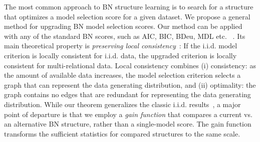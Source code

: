 \documentclass{article}
\begin{document}
The most common approach to BN structure learning is to search for a structure that optimizes a model selection score for a given dataset. We propose a general method for upgrading BN model selection scores.
Our method can be applied with any of the standard BN scores, such as AIC, BIC, BDeu, MDL etc. ~\cite{bouckaert95:_bayes}. Its main theoretical property is {\em preserving local consistency}~\cite{Chickering2002}: If the i.i.d. model criterion is locally consistent for i.i.d. data, the upgraded criterion is locally consistent for multi-relational data. Local consistency combines (i) consistency: as the amount of available data increases, the model selection criterion selects a graph that can represent the data generating distribution, and (ii) optimality: the graph contains no edges that are redundant for representing the data generating distribution.
%
%
While our theorem generalizes the classic i.i.d. results~\cite{Chickering2002}, a major point of departure is that we employ a {\em gain function} that compares  a current vs. an alternative BN structure, rather than a single-model score. The gain function transforms the sufficient statistics for compared structures to the same scale.


\end{document}
